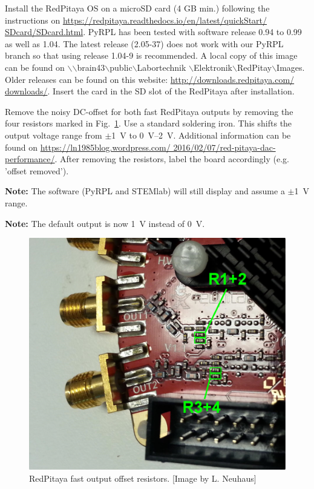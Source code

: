 \documentclass[twoside,a4paper]{refart}
\begin{document}
 Install the RedPitaya OS on a microSD card (4 GB min.) following the instructions on \href{https://redpitaya.readthedocs.io/en/latest/quickStart/SDcard/SDcard.html}{https://redpitaya.readthedocs.io/en/latest/quickStart/ SDcard/SDcard.html}. PyRPL has been tested with software release 0.94 to 0.99 as well as 1.04.  The latest release (2.05-37) does not work with our PyRPL branch so that using release 1.04-9 is recommended.  A local copy of this image can be found on $\backslash$$\backslash$brain43$\backslash$public$\backslash$Labortechnik $\backslash$Elektronik$\backslash$RedPitay$\backslash$Images. Older releases can be found on this website: \href{http://downloads.redpitaya.com/downloads/}{http://downloads.redpitaya.com/ downloads/}. Insert the card in the SD slot of the RedPitaya after installation.

Remove the noisy DC-offset for both fast RedPitaya outputs by removing the four resistors marked in Fig.~\ref{fig:offset}. Use a standard soldering iron. This shifts the output voltage range from $\pm$\SI{1}{\volt} to \SI{0}{\volt}--\SI{2}{\volt}. Additional information can be found on \href{https://ln1985blog.wordpress.com/2016/02/07/red-pitaya-dac-performance/}{https://ln1985blog.wordpress.com/ 2016/02/07/red-pitaya-dac-performance/}. After removing the resistors, label the board accordingly (e.g. 'offset removed').

\textbf{Note:} The software (PyRPL and STEMlab) will still display and assume a $\pm$\SI{1}{\volt} range.

\textbf{Note:} The default output is now \SI{1}{\volt} instead of \SI{0}{\volt}.


\begin{figure}[H]
\includegraphics[width=\textwidth]{fig/offset-removal.png}
\caption{RedPitaya fast output offset resistors. [Image by L. Neuhaus]\label{fig:offset}}
\end{figure}
\end{document}
